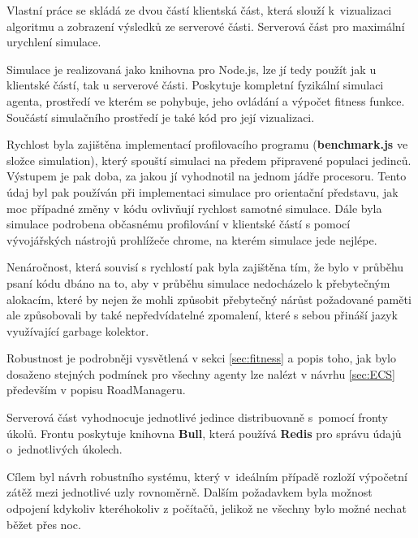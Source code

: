 



Vlastní práce se skládá ze dvou částí klientská část, která slouží k~vizualizaci algoritmu a zobrazení výsledků ze serverové části. Serverová část pro maximální urychlení simulace. 

Simulace je realizovaná jako knihovna pro Node.js, lze jí tedy použít jak u klientské částí, tak u serverové části. Poskytuje kompletní fyzikální simulaci agenta, prostředí ve kterém se pohybuje, jeho ovládání a výpočet fitness funkce. Součástí simulačního prostředí je také kód pro její vizualizaci.


Rychlost byla zajištěna implementací profilovacího programu (\textbf{benchmark.js} ve složce simulation), který spouští simulaci na předem připravené populaci jedinců. Výstupem je pak doba, za jakou jí vyhodnotil na jednom jádře procesoru. Tento údaj byl pak používán při implementaci simulace pro orientační představu, jak moc případné změny v kódu ovlivňují rychlost samotné simulace. Dále byla simulace podrobena občasnému profilování v klientské částí s pomocí vývojářských nástrojů prohlížeče chrome, na kterém simulace jede nejlépe.

Nenáročnost, která souvisí s rychlostí pak byla zajištěna tím, že bylo v průběhu psaní kódu dbáno na to, aby v průběhu simulace nedocházelo k přebytečným alokacím, které by nejen že mohli způsobit přebytečný nárůst požadované paměti ale způsobovali by také nepředvídatelné zpomalení, které s sebou přináší jazyk využívající garbage kolektor.

Robustnost je podrobněji vysvětlená v sekci \ref{sec:fitness} a popis toho, jak bylo dosaženo stejných podmínek pro všechny agenty lze nalézt v návrhu \ref{sec:ECS} především v popisu RoadManageru.

Serverová část vyhodnocuje jednotlivé jedince distribuovaně s~pomocí fronty úkolů. Frontu poskytuje knihovna \textbf{Bull}, která používá \textbf{Redis} pro správu údajů o~jednotlivých úkolech.

Cílem byl návrh robustního systému, který v~ideálním případě rozloží výpočetní zátěž mezi jednotlivé uzly rovnoměrně. Dalším požadavkem byla možnost odpojení kdykoliv kteréhokoliv z počítačů, jelikož ne všechny bylo možné nechat běžet přes noc.


